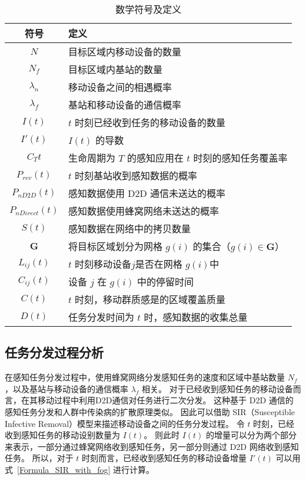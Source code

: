 \begin{table}[h]
  \vspace{-0.5em}
  \caption{数学符号及定义}
  \vspace{-0.5em}
  \centering
  \label{table_notations_UIC}
  \begin{tabular}{|c|p{9.5cm}|}
  \hline
  \textbf{符号} & \textbf{定义}\\
  \hline
  $N$ & 目标区域内移动设备的数量\\\hline
  $N_f$ & 目标区域内基站的数量\\\hline
  $\lambda_n$ & 移动设备之间的相遇概率\\\hline
  $\lambda_f$ & 基站和移动设备的通信概率\\\hline
  $I(t)$ & $t$ 时刻已经收到任务的移动设备的数量\\\hline
  $I'(t)$ & $I(t)$ 的导数\\\hline
  $C_T{t}$ & 生命周期为 $T$ 的感知应用在 $t$ 时刻的感知任务覆盖率\\\hline
  $P_{rcv}(t)$ & $t$ 时刻基站收到感知数据的概率\\\hline
  $P_{nD2D}(t)$ & 感知数据使用 D2D 通信未送达的概率\\\hline
  $P_{nDirect}(t)$ & 感知数据使用蜂窝网络未送达的概率\\\hline
  $S(t)$ & 感知数据在网络中的拷贝数量\\\hline
  $\boldsymbol{G}$ & 将目标区域划分为网格 $g(i)$ 的集合（$g(i) \in \boldsymbol{G}$）\\\hline
  $L_{ij}(t)$ & $t$ 时刻移动设备$j$是否在网格 $g(i)$中\\\hline
  $C_{ij}(t)$ & 设备 $j$ 在 $g(i)$ 中的停留时间\\\hline
  $C(t)$ & $t$ 时刻，移动群质感是的区域覆盖质量\\\hline
  $D(t)$ & 任务分发时间为 $t$ 时，感知数据的收集总量\\\hline
\end{tabular}
\end{table}

\subsection{任务分发过程分析}

在感知任务分发过程中，使用蜂窝网络分发感知任务的速度和区域中基站数量 $N_f$，以及基站与移动设备的通信概率 $\lambda_f$ 相关。
对于已经收到感知任务的移动设备而言，在其移动过程中利用D2D通信对任务进行二次分发。
这种基于 D2D 通信的感知任务分发和人群中传染病的扩散原理类似。
因此可以借助 SIR（Susceptible Infective Removal）模型来描述移动设备之间的任务分发过程。
令 $t$ 时刻，已经收到感知任务的移动设别数量为 $I(t)$。
则此时 $I(t)$ 的增量可以分为两个部分来表示，一部分通过蜂窝网络收到感知任务，另一部分则通过 D2D 网络收到感知任务。
所以，对于 $t$ 时刻而言，已经收到感知任务的移动设备增量 $I'(t)$ 可以用式~\eqref{Formula_SIR_with_fog} 进行计算。

